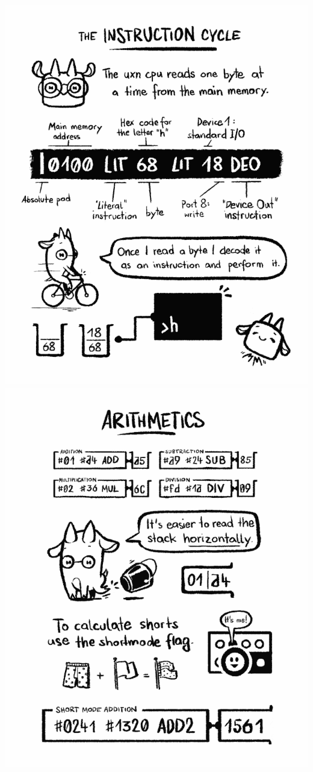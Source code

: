 \documentclass[paperheight=4.25in,paperwidth=2.75in,20pt]{article}
\begin{document}
  \includegraphics[width=1.0\paperwidth]{images/06_instruction_cycle-680.png}
  \includegraphics[width=1.0\paperwidth]{images/07_aritmetics-680.png}
\end{document}
